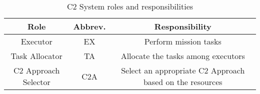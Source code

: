 \begin{table}[ht]
	\small
	\fontsize{10}{10}\selectfont
	\centering
	\caption{C2 System roles and responsibilities}
	\label{table:table04}
	
	\begin{tabular}{ccc}
	\hline
		\textbf{Role}
		& \textbf{Abbrev.}
		& \textbf{Responsibility} \\ [1ex]
	\hline	
	
	Executor & EX & Perform mission tasks  \\[1ex]
	Task Allocator & TA & Allocate the tasks among executors \\[1ex]
	C2 Approach Selector & C2A & Select an appropriate C2 Approach based on the resources \\[1ex]
	\hline
	\end{tabular}
\end{table} 